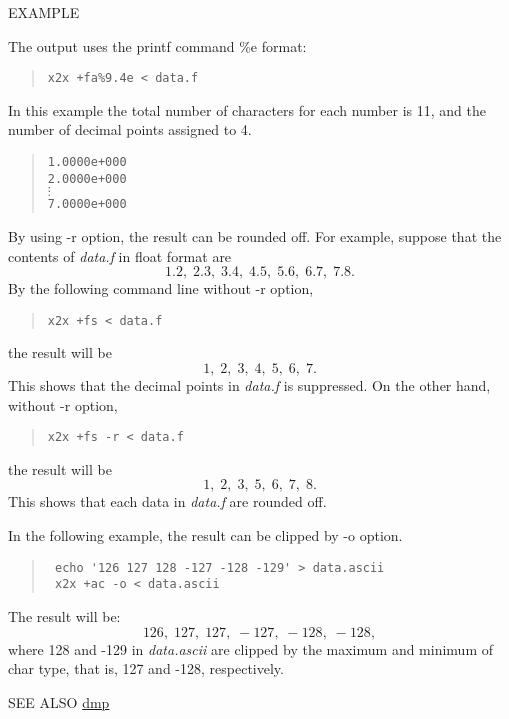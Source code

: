 \begin{qsection}{EXAMPLE}
\par
The output uses the printf command \%e format:
\begin{quote}
  \verb!x2x +fa%9.4e < data.f!
\end{quote}
In this example the total number of characters for each number
is 11, and the number of decimal points assigned to 4.
\begin{quote}
  \verb!1.0000e+000! \\
  \verb!2.0000e+000! \\
  \mbox{\hspace{2em}}$\vdots$ \\
  \verb!7.0000e+000!
\end{quote}
\par
By using -r option, the result can be rounded off.
For example, suppose that the contents of {\em data.f} in float format are
\begin{displaymath}
  1.2,\; 2.3,\; 3.4,\; 4.5,\; 5.6,\; 6.7,\; 7.8.
\end{displaymath}
By the following command line without -r option,
\begin{quote}
  \verb!x2x +fs < data.f!
\end{quote}
the result will be
\begin{displaymath}
  1,\; 2,\; 3,\; 4,\; 5,\; 6,\; 7.
\end{displaymath}
This shows that the decimal points in {\em data.f} is suppressed.
On the other hand, without -r option,
\begin{quote}
  \verb!x2x +fs -r < data.f!
\end{quote}
the result will be
\begin{displaymath}
  1,\; 2,\; 3,\; 5,\; 6,\; 7,\; 8.
\end{displaymath}
This shows that each data in {\em data.f} are rounded off.
\par
In the following example, the result can be clipped by -o option.
\begin{quote}
  \verb! echo '126 127 128 -127 -128 -129' > data.ascii! \\
  \verb! x2x +ac -o < data.ascii!
\end{quote}
The result will be:
\begin{displaymath}
 126,\; 127,\; 127,\; -127,\; -128,\; -128,
\end{displaymath}
where 128 and -129 in {\em data.ascii} are clipped by the maximum and minimum of
char type, that is, 127 and -128, respectively.
\end{qsection}

\begin{qsection}{SEE ALSO}
\hyperlink{dmp}{dmp}
\end{qsection}
